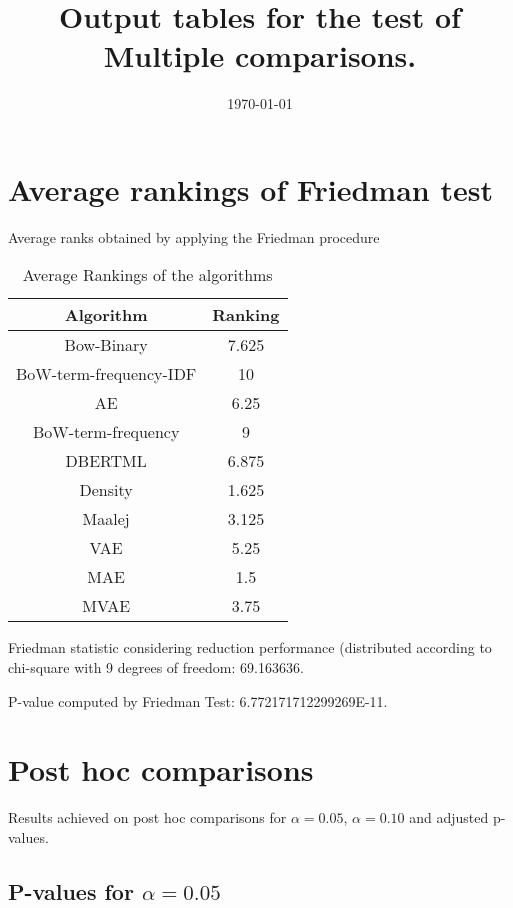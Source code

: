 \documentclass[a4paper,10pt]{article}
\title{Output tables for the test of Multiple comparisons.}
\author{}
\date{\today}
\begin{document}
\begin{landscape}
\pagestyle{empty}
\maketitle
\thispagestyle{empty}
\section{Average rankings of Friedman test}



Average ranks obtained by applying the Friedman procedure

\begin{table}[!htp]
\centering
\begin{tabular}{|c|c|}\hline
Algorithm&Ranking\\\hline
Bow-Binary & 7.625\\
BoW-term-frequency-IDF & 10\\
AE & 6.25\\
BoW-term-frequency & 9\\
DBERTML & 6.875\\
Density & 1.625\\
Maalej & 3.125\\
VAE & 5.25\\
MAE & 1.5\\
MVAE & 3.75\\
\hline
\end{tabular}
\caption{Average Rankings of the algorithms}
\end{table}

Friedman statistic considering reduction performance (distributed according to chi-square with 9 degrees of freedom: 69.163636.

P-value computed by Friedman Test: 6.772171712299269E-11.\newline



\pagebreak

\section{Post hoc comparisons}

Results achieved on post hoc comparisons for $\alpha = 0.05$, $\alpha = 0.10$ and adjusted p-values.

\subsection{P-values for $\alpha=0.05$}


\end{landscape}
\end{document}
